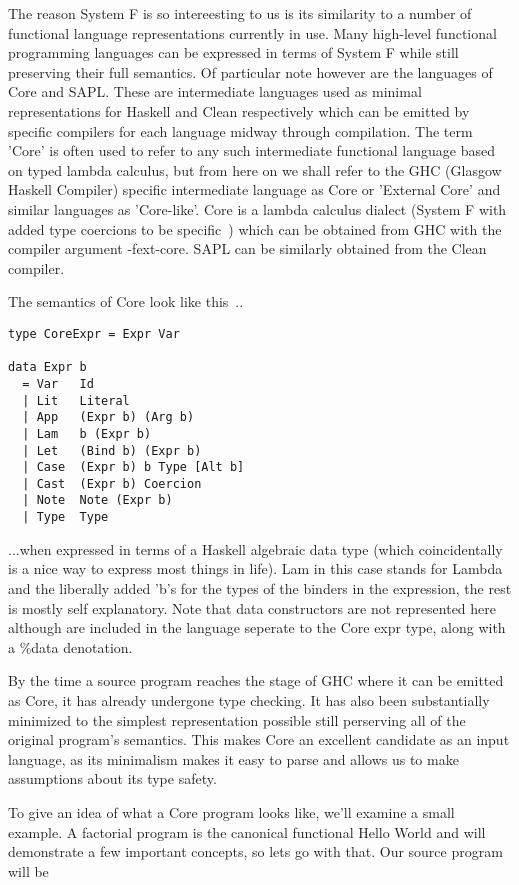 The reason System F is so intereesting to us is its similarity to a number of functional
language representations currently in use. Many high-level functional programming languages
can be expressed in terms of System F while still preserving their full semantics. Of
particular note however are the languages of Core and SAPL. These are intermediate languages
used as minimal representations for Haskell and Clean respectively which can be emitted by
specific compilers for each language midway through compilation. The term 'Core' is often
used to refer to any such intermediate functional language based on typed lambda calculus,
but from here on we shall refer to the GHC (Glasgow Haskell Compiler) specific intermediate
language as Core or 'External Core' and similar languages as 'Core-like'. Core is a lambda
calculus dialect (System F with added type coercions to be specific~\cite{SystemF}) which
can be obtained from GHC with the compiler argument -fext-core. SAPL can be similarly 
obtained from the Clean compiler. 


\noindent The semantics of Core look like this~\cite{Ext-Core}..

\begin{verbatim}
type CoreExpr = Expr Var

data Expr b 
  = Var	  Id
  | Lit   Literal
  | App   (Expr b) (Arg b)
  | Lam   b (Expr b)
  | Let   (Bind b) (Expr b)
  | Case  (Expr b) b Type [Alt b]
  | Cast  (Expr b) Coercion
  | Note  Note (Expr b)
  | Type  Type
\end{verbatim}

\noindent ...when expressed in terms of a Haskell algebraic data type (which 
coincidentally is a nice way to express most things in life). Lam in this
case stands for Lambda and the liberally added 'b's for the types of the binders
in the expression, the rest is mostly self explanatory. Note that data constructors
are not represented here although are included in the language seperate to the
Core expr type, along with a \%data denotation.

By the time a source program reaches the stage of GHC where it can be emitted
as Core, it has already undergone type checking. It has also been substantially 
minimized to the simplest representation
possible still perserving all of the original program's semantics. This makes
Core an excellent candidate as an input language, as its minimalism makes it
easy to parse and allows us to make assumptions about its type safety.

To give an idea of what a Core program looks like, we'll examine a small 
example. A factorial program is the canonical functional Hello World and will
demonstrate a few important concepts, so lets go with that. Our source program
will be 

